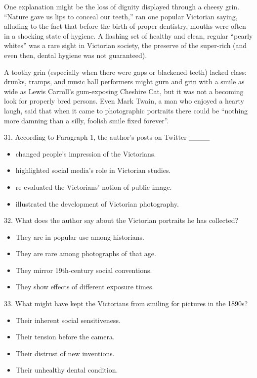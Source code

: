 \documentclass[UTF8,11pt]{ctexart}
\begin{document}
One explanation might be the loss of dignity displayed through a cheesy grin. “Nature gave us lips to conceal our teeth,” ran one popular Victorian saying, alluding to the fact that before the birth of proper dentistry, mouths were often in a shocking state of hygiene. A flashing set of healthy and clean, regular “pearly whites” was a rare sight in Victorian society, the preserve of the super-rich (and even then, dental hygiene was not guaranteed).


A toothy grin (especially when there were gaps or blackened teeth) lacked class: drunks, tramps, and music hall performers might gurn and grin with a smile as wide as Lewis Carroll’s gum-exposing Cheshire Cat, but it was not a becoming look for properly bred persons. Even Mark Twain, a man who enjoyed a hearty laugh, said that when it came to photographic portraits there could be “nothing more damning than a silly, foolish smile fixed forever”.


31. According to Paragraph 1, the author’s posts on Twitter \_\_\_\_


\begin{itemize}[leftmargin=2em,itemsep=.2em,topsep=.4em]\item[A.] changed people’s impression of the Victorians.
\item[B.] highlighted social media’s role in Victorian studies.
\item[C.] re-evaluated the Victorians’ notion of public image.
\item[D.] illustrated the development of Victorian photography.
\end{itemize}

32. What does the author say about the Victorian portraits he has collected?


\begin{itemize}[leftmargin=2em,itemsep=.2em,topsep=.4em]\item[A.] They are in popular use among historians.
\item[B.] They are rare among photographs of that age.
\item[C.] They mirror 19th-century social conventions.
\item[D.] They show effects of different exposure times.
\end{itemize}

33. What might have kept the Victorians from smiling for pictures in the 1890s?


\begin{itemize}[leftmargin=2em,itemsep=.2em,topsep=.4em]\item[A.] Their inherent social sensitiveness.
\item[B.] Their tension before the camera.
\item[C.] Their distrust of new inventions.
\item[D.] Their unhealthy dental condition.
\end{itemize}
\end{document}
